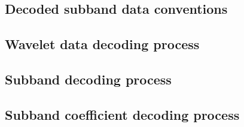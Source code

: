 

\newcommand{\LL}{\textit{LL}}
\newcommand{\LH}{\textit{LH}}
\newcommand{\HL}{\textit{HL}}
\newcommand{\HH}{\textit{HH}}

\label{transformdec}


\subsection{Decoded subband data conventions}
\subsection{Wavelet data decoding process}
\subsection{Subband decoding process}
\subsection{Subband coefficient decoding process}
